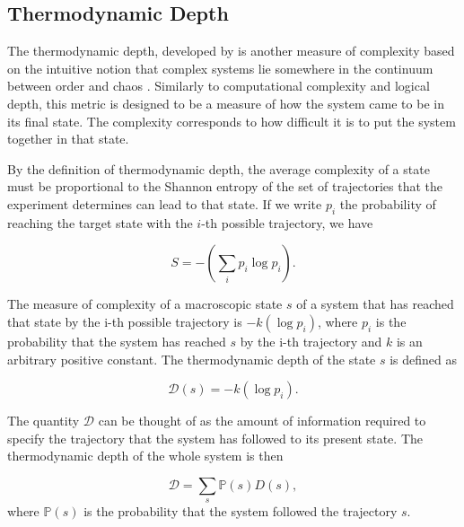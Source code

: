 \subsection{Thermodynamic Depth}

The thermodynamic depth, developed by
\textcite{lloydComplexityThermodynamicDepth1988} is another measure of
complexity based on the intuitive notion that complex systems lie somewhere in
the continuum between order and chaos
\parencite{chaitinInformationRandomnessIncompleteness1990,
  ceccattoComplexityHierarchicalSystems1988, deutschQuantumTheoryChurch1985}.
Similarly to computational complexity and logical depth, this metric is designed
to be a measure of how the system came to be in its final state. The complexity
corresponds to how difficult it is to put the system together in that state.

By the definition of thermodynamic depth, the average complexity of a state must be
proportional to the Shannon entropy
\parencite{shannonMathematicalTheoryCommunication1975} of the set of
trajectories that the experiment determines can lead to that state. If we write $p_i$ 
the probability of reaching the target state with the $i$-th possible trajectory, we have 

\begin{equation}
  \label{eq:3}
  S = -\left(\sum_{i} p_{i} \log p_{i}\right).
\end{equation}

The measure of complexity of a macroscopic state $s$ of a system that has
reached that state by the i-th possible trajectory is $-k(\log p_{i})$, where
$p_{i}$ is the probability that the system has reached $s$ by the i-th
trajectory and $k$ is an arbitrary positive constant. The thermodynamic depth of
the state $s$ is defined as

\begin{equation}
  \label{eq:4}
  \mathcal{D}(s) = -k(\log p_{i}).
\end{equation}

The quantity $\mathcal{D}$ can be thought of as the amount of information
required to specify the trajectory that the system has followed to its present
state. The thermodynamic depth of the whole system is then

\begin{equation}
  \label{eq:5}
  \mathcal{D} = \sum_{s}\mathbb{P}(s)D(s),
\end{equation}
where $\mathbb{P}(s)$ is the probability that the system followed the
trajectory $s$.

